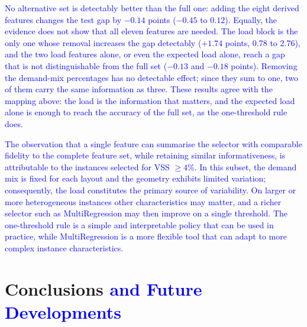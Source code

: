 \documentclass[authoryear,preprint,12pt]{elsarticle}
\newcommand{\rev}[1]{\textcolor{blue}{{#1}}}
\begin{document}
\rev{No alternative set is detectably better than the full one: adding the eight derived features changes the test gap by $-0.14$ points ($-0.45$ to $0.12$). Equally, the evidence does not show that all eleven features are needed. The load block is the only one whose removal increases the gap detectably ($+1.74$ points, 0.78 to 2.76), and the two load features alone, or even the expected load alone, reach a gap that is not distinguishable from the full set ($-0.13$ and $-0.18$ points). Removing the demand-mix percentages has no detectable effect; since they sum to one, two of them carry the same information as three. These results agree with the mapping above: the load is the information that matters, and the expected load alone is enough to reach the accuracy of the full set, as the one-threshold rule does.}

\rev{The observation that a single feature can summarise the selector with comparable fidelity to the complete feature set, while retaining similar informativeness, is attributable to the instances selected for VSS $\ge 4\%$. In this subset, the demand mix is fixed for each layout and the geometry exhibits limited variation; consequently, the load constitutes the primary source of variability. On larger or more heterogeneous instances other characteristics may matter, and a richer selector such as MultiRegression may then improve on a single threshold. The one-threshold rule is a simple and interpretable policy that can be used in practice, while MultiRegression is a more flexible tool that can adapt to more complex instance characteristics.}



\section{Conclusions \rev{and Future Developments}}\label{end}
\end{document}
